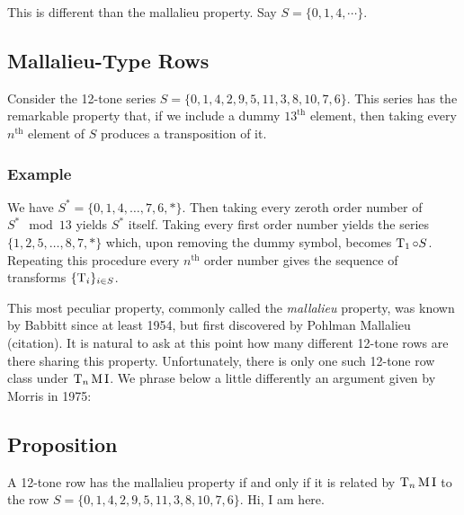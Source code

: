 This is different than the mallalieu property. Say $S = \{ 0, 1, 4, \cdots \}$.

\subsection{Mallalieu-Type Rows}

Consider the 12-tone series $S = \{ 0, 1, 4, 2, 9, 5, 11, 3, 8, 10, 7, 6 \}$. This series has the remarkable property that, if we include a dummy $13^\text{th}$ element, then taking every $n^\text{th}$ element of $S$ produces a transposition of it.

\subsubsection{Example}

We have $S^* = \{ 0, 1, 4, \dots, 7, 6, * \}$. Then taking every zeroth order number of $S^* \mod 13$ yields $S^*$ itself. Taking every first order number yields the series $\{ 1, 2, 5, \dots, 8, 7, * \}$ which, upon removing the dummy symbol, becomes $\operatorname{T}_1 \circ S$. Repeating this procedure every $n^\text{th}$ order number gives the sequence of transforms $\{ \operatorname{T}_i \}_{i \in S}$.

This most peculiar property, commonly called the \emph{mallalieu} property, was known by Babbitt since at least 1954, but first discovered by Pohlman Mallalieu (citation). It is natural to ask at this point how many different 12-tone rows are there sharing this property. Unfortunately, there is only one such 12-tone row class under $\operatorname{T}_n\operatorname{M}\operatorname{I}$. We phrase below a little differently an argument given by Morris in 1975:

\subsection{Proposition} \label{mallalieu-Morris}

A 12-tone row has the mallalieu property if and only if it is related by $\operatorname{T}_n\operatorname{M}\operatorname{I}$ to the row $S = \{ 0, 1, 4, 2, 9, 5, 11, 3, 8, 10, 7, 6 \}$. Hi, I am here.

